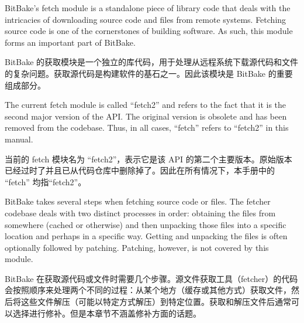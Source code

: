 % 
% 
% 


BitBake's fetch module is a standalone piece of library code that deals with the intricacies of downloading source code and files from remote systems. Fetching source code is one of the cornerstones of building software. As such, this module forms an important part of BitBake.

BitBake 的获取模块是一个独立的库代码，用于处理从远程系统下载源代码和文件的复杂问题。获取源代码是构建软件的基石之一。因此该模块是 BitBake 的重要组成部分。

The current fetch module is called ``fetch2'' and refers to the fact that it is the second major version of the API. The original version is obsolete and has been removed from the codebase. Thus, in all cases, ``fetch'' refers to ``fetch2'' in this manual.

当前的 fetch 模块名为 ``fetch2''，表示它是该 API 的第二个主要版本。原始版本已经过时了并且已从代码仓库中删除掉了。因此在所有情况下，本手册中的 ``fetch'' 均指``fetch2''。


BitBake takes several steps when fetching source code or files. The fetcher codebase deals with two distinct processes in order: obtaining the files from somewhere (cached or otherwise) and then unpacking those files into a specific location and perhaps in a specific way. Getting and unpacking the files is often optionally followed by patching. Patching, however, is not covered by this module.

BitBake 在获取源代码或文件时需要几个步骤。源文件获取工具\footnotemark[1]（fetcher）的代码会按照顺序来处理两个不同的过程：从某个地方（缓存或其他方式）获取文件，然后将这些文件解压（可能以特定方式解压）到特定位置。获取和解压文件后通常可以选择进行修补。但是本章节不涵盖修补方面的话题。

